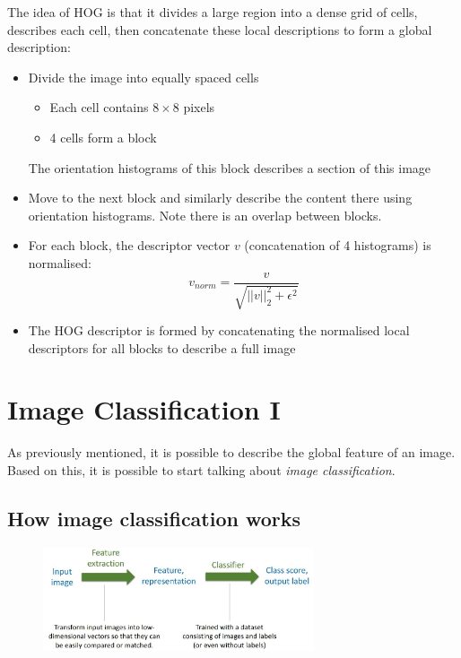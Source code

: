 \documentclass{report}
\begin{document}
The idea of HOG is that it divides a large region into a dense grid of cells,
describes each cell, then concatenate these local descriptions to form a
global description:
\begin{itemize}
    \item Divide the image into equally spaced cells
    \begin{itemize}
        \item Each cell contains $8 \times 8$ pixels
        \item 4 cells form a block
    \end{itemize}

    The orientation histograms of this block describes a section of this image
    
    \item Move to the next block and similarly describe the content there using
    orientation histograms. Note there is an overlap between blocks.

    \item For each block, the descriptor vector $v$ (concatenation of 4 histograms) is normalised:
    $$
        v_{norm} = \frac{v}{\sqrt{||v||^2_2 + \epsilon^2}}
    $$

    \item The HOG descriptor is formed by concatenating the normalised local
    descriptors for all blocks to describe a full image 
\end{itemize}

\chapter{Image Classification I}

As previously mentioned, it is possible to describe the global feature of an
image. Based on this, it is possible to start talking about \textit{image
classification}.

\section{How image classification works}

\begin{figure}[h]
    \centering
    \includegraphics[width=8cm]{image classification.JPG}
\end{figure}
\end{document}
